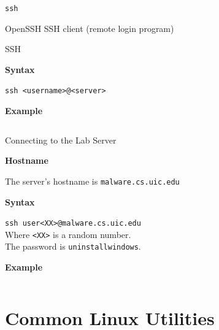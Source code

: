 \documentclass{beamer}
\begin{document}
\begin{frame}
	\begin{center}
		\begin{Huge}
			\texttt{ssh} \\
		\end{Huge}
		OpenSSH SSH client (remote login program)
	\end{center}
\end{frame}

\begin{frame}{SSH}
	\begin{Large}
		\textbf{Syntax} \\
	\end{Large}
	\texttt{ssh <username>@<server>}

	\vspace{0.3cm}

	\begin{Large}
		\textbf{Example} \\
	\end{Large}
	\inputminted{shell-session}{ssh.txt}
\end{frame}

\begin{frame}{Connecting to the Lab Server}
	\begin{Large}
		\textbf{Hostname} \\
	\end{Large}
	The server's hostname is \texttt{malware.cs.uic.edu}

	\vspace{0.3cm}

	\begin{Large}
		\textbf{Syntax} \\
	\end{Large}
	\texttt{ssh user<XX>@malware.cs.uic.edu} \\
	Where \texttt{<XX>} is a random number. \\
	The password is \texttt{uninstallwindows}.

	\vspace{0.3cm}

	\begin{Large}
		\textbf{Example} \\
	\end{Large}
	\inputminted{shell-session}{ssh-conn.txt}
\end{frame}

\section{Common Linux Utilities}
\end{document}
